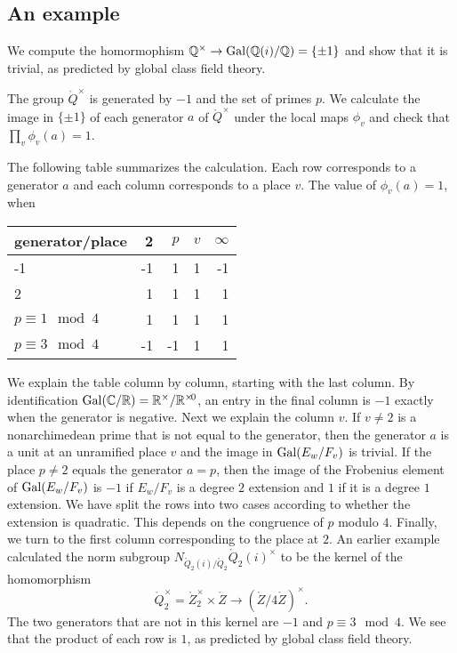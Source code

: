 \documentclass{amsart}
\def\CC{\ring{C}}
\def\RR{\ring{R}}
\def\ZZ{\ring{Z}}
\def\QQ{\ring{Q}}
\def\oG{\op{Gal}}
\begin{document}
\subsection{An example}

We compute the homormophism $\QQ^\times\to \oG(\QQ(i)/\QQ)=\{\pm1\}$ and show that
it is trivial, as predicted by global class field theory.

The group  $\QQ^\times$ is  generated by $-1$ and the set of primes $p$.
We calculate the image in $\{\pm1\}$ of each generator $a$ of $\QQ^\times$ 
under the local maps $\phi_v$ and check that $\prod_v \phi_v(a) = 1$.

The following table summarizes the calculation.  Each row corresponds to a generator $a$
and each column corresponds to a place $v$. The value of $\phi_v(a)=1$, when

\begin{centering}
\begin{tabular}{l || r | r | r | r}
generator/place     & 2 & $p$ & $v$ & $\infty$ \\
\hline 
-1 & -1 & 1 &  1 & -1 \\
2  & 1 & 1 & 1 & 1 \\
$p\equiv 1\mod 4$  & 1 & 1 & 1 & 1\\
$p\equiv 3 \mod 4$ & -1 & -1 & 1 & 1
\end{tabular}
\end{centering}

We explain the table column by column, starting with the last
column. By identification $\oG(\CC/\RR) = \RR^\times/\RR^{\times\!0}$,
an entry in the final column is $-1$ exactly when the generator is
negative.  Next we explain the column $v$.  If $v\ne 2$ is a
nonarchimedean prime that is not equal to the generator, then the
generator $a$ is a unit at an unramified place $v$ and the image in
$\oG(E_w/F_v)$ is trivial.  If the place $p\ne 2$ equals the generator
$a=p$, then the image of the Frobenius element of $\oG(E_w/F_v)$ is
$-1$ if $E_w/F_v$ is a degree $2$ extension and $1$ if it is a degree
$1$ extension.  We have split the rows into two cases according to
whether the extension is quadratic. This depends on the congruence of
$p$ modulo $4$.   Finally, we turn to the first column corresponding to the place at $2$.  
An earlier
example calculated the norm subgroup $N_{\QQ_2(i)/\QQ_2}
\QQ_2(i)^\times$ to be the kernel of the homomorphism
\[
\QQ_2^\times = \ZZ_2^\times \times \ZZ \to (\ZZ/4\ZZ)^\times.
\]
The two generators that are not in this kernel are $-1$ and $p\equiv 3
\mod 4$.  We see that the product of each row is $1$, as predicted by
global class field theory.
\end{document}
